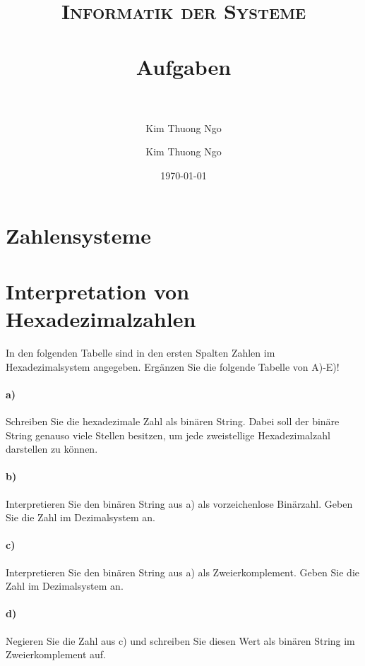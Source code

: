 \documentclass[paper=a4, fontsize=11pt]{scrartcl}
\author{Kim Thuong Ngo}
\title{	
\normalfont \normalsize 
\textsc{Informatik der Systeme} \\ [25pt] 
\horrule{0.5pt} \\[0.4cm] 
\huge Aufgaben \\ 
\horrule{2pt} \\[0.5cm] 
}
\author{Kim Thuong Ngo}
\date{\normalsize\today}
\numberwithin{equation}{section}
\numberwithin{figure}{section}
\numberwithin{table}{section}
\begin{document}
\maketitle 

\newpage

\tableofcontents

\newpage


\section{Zahlensysteme}

\section{Interpretation von Hexadezimalzahlen}

In den folgenden Tabelle sind in den ersten Spalten Zahlen im Hexadezimalsystem angegeben. Ergänzen Sie die folgende Tabelle von A)-E)! \\

\paragraph{a)}
Schreiben Sie die hexadezimale Zahl als binären String. Dabei soll der binäre String genauso viele Stellen besitzen, um jede zweistellige Hexadezimalzahl darstellen zu können. \\

\paragraph{b)}
Interpretieren Sie den binären String aus a) als vorzeichenlose Binärzahl. Geben Sie die Zahl im Dezimalsystem an. \\

\paragraph{c)}
Interpretieren Sie den binären String aus a) als Zweierkomplement. Geben Sie die Zahl im Dezimalsystem an. \\

\paragraph{d)}
Negieren Sie die Zahl aus c) und schreiben Sie diesen Wert als binären String im Zweierkomplement auf. \\
\end{document}
